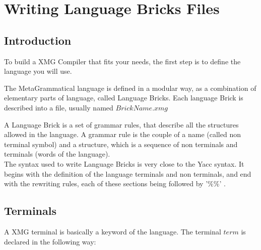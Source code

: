 \documentclass[11pt,fleqn]{book} %
\begin{document}
\pagestyle{empty} %

\tableofcontents %

\cleardoublepage %

\pagestyle{fancy} %



\chapter{Writing Language Bricks Files}

\section{Introduction}

To build a XMG Compiler that fits your needs, the first step is to define the language you will use. 

The MetaGrammatical language is defined in a modular way, as a combination of elementary parts of language, called Language Bricks. Each language Brick is described into a file, usually named $BrickName.xmg$ 

A Language Brick is a set of grammar rules, that describe all the structures allowed in the language. A grammar rule is the couple of a name (called non terminal symbol) and a structure, which is a sequence of non terminals and terminals (words of the language).\\  

The syntax used to write Language Bricks is very close to the Yacc syntax. %
It begins with the definition of the language terminals and non terminals, and end with the rewriting rules, each of these sections being followed by '$\%\%$' .  


\section{Terminals}

A XMG terminal is basically a keyword of the language. 
The terminal $term$ is declared in the following way:
\end{document}
